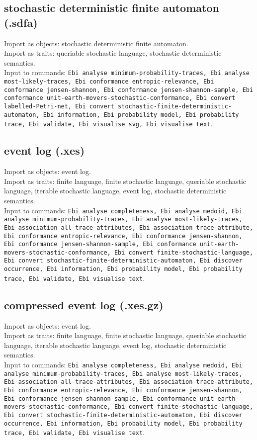 {\subsection{stochastic deterministic finite automaton (.sdfa)}
Import as objects: stochastic deterministic finite automaton.
\\Import as traits: queriable stochastic language, stochastic deterministic semantics.
\\Input to commands: \texttt{Ebi analyse minimum-probability-traces, Ebi analyse most-likely-traces, Ebi conformance entropic-relevance, Ebi conformance jensen-shannon, Ebi conformance jensen-shannon-sample, Ebi conformance unit-earth-movers-stochastic-conformance, Ebi convert labelled-Petri-net, Ebi convert stochastic-finite-deterministic-automaton, Ebi information, Ebi probability model, Ebi probability trace, Ebi validate, Ebi visualise svg, Ebi visualise text}.
\subsection{event log (.xes)}
Import as objects: event log.
\\Import as traits: finite language, finite stochastic language, queriable stochastic language, iterable stochastic language, event log, stochastic deterministic semantics.
\\Input to commands: \texttt{Ebi analyse completeness, Ebi analyse medoid, Ebi analyse minimum-probability-traces, Ebi analyse most-likely-traces, Ebi association all-trace-attributes, Ebi association trace-attribute, Ebi conformance entropic-relevance, Ebi conformance jensen-shannon, Ebi conformance jensen-shannon-sample, Ebi conformance unit-earth-movers-stochastic-conformance, Ebi convert finite-stochastic-language, Ebi convert stochastic-finite-deterministic-automaton, Ebi discover occurrence, Ebi information, Ebi probability model, Ebi probability trace, Ebi validate, Ebi visualise text}.
\subsection{compressed event log (.xes.gz)}
Import as objects: event log.
\\Import as traits: finite language, finite stochastic language, queriable stochastic language, iterable stochastic language, event log, stochastic deterministic semantics.
\\Input to commands: \texttt{Ebi analyse completeness, Ebi analyse medoid, Ebi analyse minimum-probability-traces, Ebi analyse most-likely-traces, Ebi association all-trace-attributes, Ebi association trace-attribute, Ebi conformance entropic-relevance, Ebi conformance jensen-shannon, Ebi conformance jensen-shannon-sample, Ebi conformance unit-earth-movers-stochastic-conformance, Ebi convert finite-stochastic-language, Ebi convert stochastic-finite-deterministic-automaton, Ebi discover occurrence, Ebi information, Ebi probability model, Ebi probability trace, Ebi validate, Ebi visualise text}.
}
